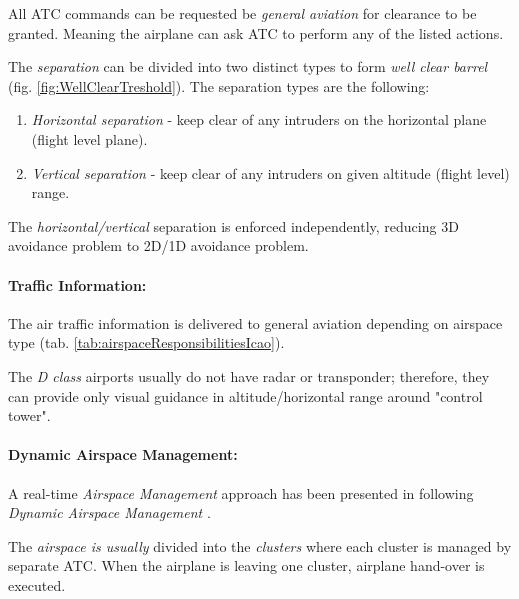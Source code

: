 \begin{note}
    All ATC commands can be requested be \emph{general aviation} for clearance to be granted. Meaning the airplane can ask ATC to perform any of the listed actions. 
\end{note}

The \emph{separation} can be divided into two distinct types to form \emph{well clear barrel} (fig. \ref{fig:WellClearTreshold}). The separation types are the following:

\begin{enumerate}
    \item \emph{Horizontal separation} - keep clear of any intruders on the horizontal plane (flight level plane).
    
    \item \emph{Vertical separation} - keep clear of any intruders on given altitude (flight level) range.
\end{enumerate}

\begin{note}
    The \emph{horizontal/vertical} separation is enforced independently, reducing 3D avoidance problem to 2D/1D avoidance problem.
\end{note}

\paragraph{Traffic Information:} The air traffic information is delivered to general aviation depending on airspace type (tab. \ref{tab:airspaceResponsibilitiesIcao}). 

\begin{note}
    The \emph{D class} airports usually do not have radar or transponder; therefore, they can provide only visual guidance in altitude/horizontal range around "control tower".
\end{note}


\paragraph{Dynamic Airspace Management:} A real-time \emph{Airspace Management} approach has been presented in \cite{gardi2014real} following \emph{Dynamic Airspace Management} \cite{gerdes2016dynamic}. 

The \emph{airspace is usually} divided into the \emph{clusters} where each cluster is managed by separate ATC. When the airplane is leaving one cluster, airplane hand-over is executed.

